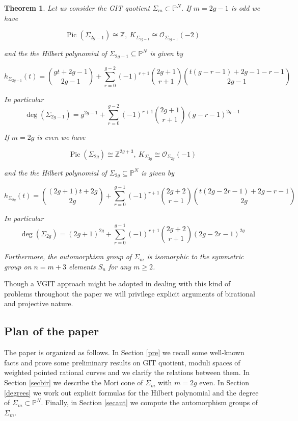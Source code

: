\documentclass[a4paper,10pt]{amsart}
\newtheorem{theoremn}{Theorem}
\theoremstyle{definition}
\DeclareMathOperator{\Pic}{Pic}
\begin{document}
\begin{theoremn}
Let us consider the GIT quotient $\Sigma_m\subset\mathbb{P}^N$. If $m = 2g-1$ is odd we have 

$$\Pic(\Sigma_{2g-1})\cong\mathbb{Z},\ K_{\Sigma_{2g-1}}\cong\mathcal{O}_{\Sigma_{2g-1}}(-2)$$

 and the  
the Hilbert polynomial of $\Sigma_{2g-1}\subseteq \mathbb{P}^N$ is given by 

$$h_{\Sigma_{2g-1}}(t) = \binom{gt+2g-1}{2g-1}+\sum_{r=0}^{g-2}(-1)^{r+1}\binom{2g+1}{r+1}\binom{t(g-r-1)+2g-1-r-1}{2g-1}$$

In particular 
$$\deg(\Sigma_{2g-1})= g^{2g-1}+\sum_{r=0}^{g-2}(-1)^{r+1}\binom{2g+1}{r+1}(g-r-1)^{2g-1}$$

If $m = 2g$ is even we have 

$$\Pic(\Sigma_{2g})\cong\mathbb{Z}^{2g+3},\ K_{\Sigma_{2g}}\cong\mathcal{O}_{\Sigma_{2g}}(-1)$$

and the  
the Hilbert polynomial of $\Sigma_{2g}\subseteq \mathbb{P}^N$ is given by 

$$h_{\Sigma_{2g}}(t) = \binom{(2g+1)t+2g}{2g}+\sum_{r=0}^{g-1}(-1)^{r+1}\binom{2g+2}{r+1}\binom{t(2g-2r-1)+2g-r-1}{2g}$$

In particular 
$$\deg(\Sigma_{2g})= (2g+1)^{2g}+\sum_{r=0}^{g-1}(-1)^{r+1}\binom{2g+2}{r+1}(2g-2r-1)^{2g}$$

Furthermore, the automorphism group of $\Sigma_m$ is isomorphic to the symmetric group on $n = m+3$ elements $S_n$ for any $m\geq 2$. 
\end{theoremn}

Though a VGIT approach might be adopted in dealing with this kind of problems throughout the paper we will privilege explicit arguments of birational and projective nature.

\subsection*{Plan of the paper}
The paper is organized as follows. In Section \ref{pre} we recall some well-known facts and prove some preliminary results on GIT quotient, moduli spaces of weighted pointed rational curves and we clarify the relations between them. In Section \ref{secbir} we describe the Mori cone of $\Sigma_m$ with $m = 2g$ even. In Section \ref{degrees} we work out explicit formulas for the Hilbert polynomial and the degree of $\Sigma_m\subset\mathbb{P}^N$. Finally, in Section \ref{secaut} we compute the automorphism groups of $\Sigma_m$.
\end{document}
